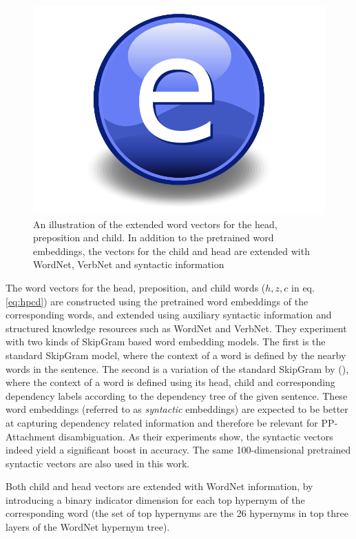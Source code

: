 \begin{figure}
    \centering
    \includegraphics{Figures/Electron.pdf}
    \caption{An illustration of the extended word vectors for the head, preposition and child. In addition to the pretrained word embeddings, the vectors for the child and head are extended with WordNet, VerbNet and syntactic information}
    \label{fig:hpcdvectors}
\end{figure}

The word vectors for the head, preposition, and child words ($h, z, c$ in eq. \ref{eq:hpcd}) are constructed using the pretrained word embeddings of the corresponding words, and extended using auxiliary syntactic information and structured knowledge resources such as WordNet and VerbNet. They experiment with two kinds of SkipGram based word embedding models. The first is the standard SkipGram model, where the context of a word is defined by the nearby words in the sentence. The second is a variation of the standard SkipGram by (\cite{bansal}), where the context of a word is defined using its head, child and corresponding dependency labels according to the dependency tree of the given sentence. These word embeddings (referred to as \textit{syntactic} embeddings) are expected to be better at capturing dependency related information and therefore be relevant for PP-Attachment disambiguation. As their experiments show, the syntactic vectors indeed yield a significant boost in accuracy. The same 100-dimensional pretrained syntactic vectors are also used in this work. 

Both child and head vectors are extended with WordNet information, by introducing a binary indicator dimension for each top hypernym of the corresponding word (the set of top hypernyms are the 26 hypernyms in top three layers of the WordNet hypernym tree). 

